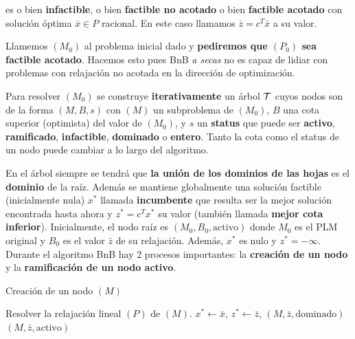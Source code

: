     es o bien \textbf{infactible}, o bien \textbf{factible no acotado} o bien \textbf{factible acotado} con solución óptima $\bar{x}\in P$ racional. En este caso llamamos $\bar{z}=c^T\bar{x}$ a su valor.
    
    Llamemos $(M_0)$ al problema inicial dado y \textbf{pediremos que $(P_0)$ sea factible acotado}. Hacemos esto pues  BnB \emph{a secas} no es capaz de lidiar con problemas con relajación no acotada en la dirección de optimización.
    
    
    
    
    
    
    
    Para resolver $(M_0)$ se construye \textbf{iterativamente} un árbol $\mathcal T$ cuyos nodos son de la forma $(M,B,s)$ con $(M)$ un subproblema de $(M_0)$, $B$ una cota superior (optimista) del valor de $(M_0)$, y $s$ un \textbf{status} que puede ser \textbf{activo}, \textbf{ramificado}, \textbf{infactible}, \textbf{dominado} o \textbf{entero}. Tanto la cota como el status de un nodo puede cambiar a lo largo del algoritmo.
    
    En el árbol  siempre se tendrá que \textbf{la unión de los dominios de las hojas} es el \textbf{dominio} de la raíz. Además se mantiene globalmente una solución factible (inicialmente nula) $x^*$ llamada \textbf{incumbente} que resulta ser la mejor solución encontrada hasta ahora y $z^*=c^Tx^*$ su valor (también llamada \textbf{mejor cota inferior}).
    Inicialmente, el nodo raíz es $(M_0,B_0,\text{activo})$ donde $M_0$ es el PLM original y $B_0$ es el valor $\bar{z}$ de su relajación. Además, $x^*$ es nulo y $z^*=-\infty$. Durante el algoritmo BnB hay 2 procesos importantes: la \textbf{creación de un nodo} y la \textbf{ramificación de un nodo activo}.
    
    
    
    \begin{algorithm}[H]
    	\caption{Creación de un nodo $(M)$}
    	\label{alg:bnb}
    	\begin{algorithmic}[1] 
    		\State Resolver la relajación lineal $(P)$ de $(M)$.
    		  
    		\EndIf
    			 {} \EndIf
    			  {$x^*\gets \bar{x}$, $z^*\gets \bar{z}$,  }\EndIf
    		\EndIf
    			 {\Return $(M,\bar{z}, \text{dominado})$} \EndIf
    			 {\Return $(M,\bar{z}, \text{activo})$} \EndIf
    		\EndIf
    	
    	\end{algorithmic}
    \end{algorithm} 
    
